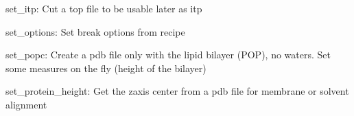 \documentclass[letterpaper,10pt,english]{sphinxmanual}
\begin{document}
\begin{fulllineitems}
\begin{fulllineitems}
\end{fulllineitems}


\begin{fulllineitems}
\label{\detokenize{gromacs:gromacs.Gromacs.set_itp}}
\pysigstartsignatures
{}
\pysigstopsignatures
\sphinxAtStartPar
set\_itp: Cut a top file to be usable later as itp

\end{fulllineitems}


\begin{fulllineitems}
\label{\detokenize{gromacs:gromacs.Gromacs.set_options}}
\pysigstartsignatures
{}
\pysigstopsignatures
\sphinxAtStartPar
set\_options: Set break options from recipe

\end{fulllineitems}


\begin{fulllineitems}
\label{\detokenize{gromacs:gromacs.Gromacs.set_popc}}
\pysigstartsignatures
{}
\pysigstopsignatures
\sphinxAtStartPar
set\_popc: Create a pdb file only with the lipid bilayer (POP), no waters.
Set some measures on the fly (height of the bilayer)

\end{fulllineitems}


\begin{fulllineitems}
\label{\detokenize{gromacs:gromacs.Gromacs.set_protein_height}}
\pysigstartsignatures
{}
\pysigstopsignatures
\sphinxAtStartPar
set\_protein\_height: Get the z\sphinxhyphen{}axis center from a pdb file for membrane or
solvent alignment


\end{fulllineitems}
\end{fulllineitems}
\end{document}
